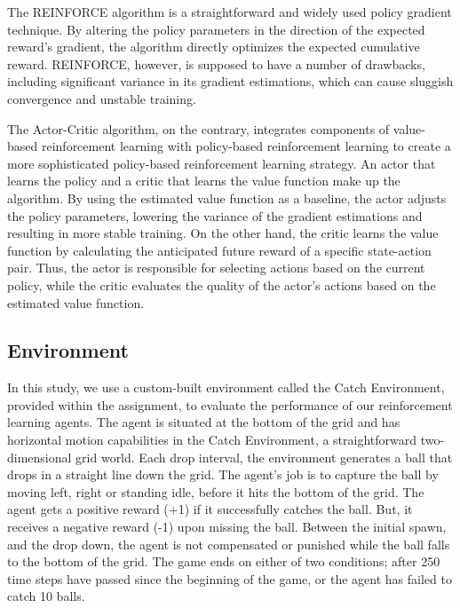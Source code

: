 \documentclass{article}
\begin{document}
    The REINFORCE algorithm is a straightforward and widely used policy gradient technique.
    By altering the policy parameters in the direction of the expected reward's gradient, the algorithm directly optimizes the expected cumulative reward.
    REINFORCE, however, is supposed to have a number of drawbacks, including significant variance in its gradient estimations, which can cause sluggish convergence and unstable training.
    
    The Actor-Critic algorithm, on the contrary, integrates components of value-based reinforcement learning with policy-based reinforcement learning to create a more sophisticated policy-based reinforcement learning strategy.
    An actor that learns the policy and a critic that learns the value function make up the algorithm.
    By using the estimated value function as a baseline, the actor adjusts the policy parameters, lowering the variance of the gradient estimations and resulting in more stable training.
    On the other hand, the critic learns the value function by calculating the anticipated future reward of a specific state-action pair.
    Thus, the actor is responsible for selecting actions based on the current policy, while the critic evaluates the quality of the actor's actions based on the estimated value function.
    
    \subsection{Environment}
    \label{I-Environment}
    In this study, we use a custom-built environment called the Catch Environment, provided within the assignment, to evaluate the performance of our reinforcement learning agents.
    The agent is situated at the bottom of the grid and has horizontal motion capabilities in the Catch Environment, a straightforward two-dimensional grid world.
    Each drop interval, the environment generates a ball that drops in a straight line down the grid. 
    The agent's job is to capture the ball by moving left, right or standing idle, before it hits the bottom of the grid. 
    The agent gets a positive reward (+1) if it successfully catches the ball.
    But, it receives a negative reward (-1) upon missing the ball. 
    Between the initial spawn, and the drop down, the agent is not compensated or punished while the ball falls to the bottom of the grid.
    The game ends on either of two conditions; after 250 time steps have passed since the beginning of the game,  or the agent has failed to catch 10 balls.
    
\end{document}
